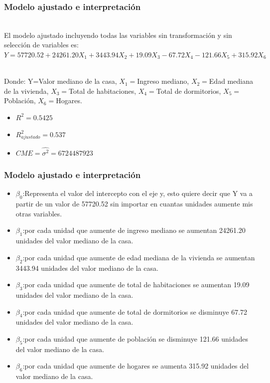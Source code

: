 \documentclass[12pt]{beamer}
\begin{document}
\begin{frame}
\frametitle{Modelo ajustado e interpretación}
~\\ El modelo ajustado incluyendo todas las variables sin transformación y sin selección de variables es:
~\\ $Y=57720.52+24261.20X_{1}+3443.94X_{2}+19.09X_{3}-67.72X_{4}-121.66X_{5}+315.92X_{6}$

~\\ Donde: Y=Valor mediano de la casa, $X_{1}=$Ingreso mediano, $X_{2}=$Edad mediana de la vivienda, $X_{3}=$Total de habitaciones, $X_{4}=$Total de dormitorios, $X_{5}=$Población, $X_{6}=$Hogares.
\begin{itemize}
\item $R^2=0.5425$
\item $R^2_{ajustado}=0.537$
\item $CME=\hat{\sigma^2}=6724487923$
\end{itemize}
\end{frame}


\begin{frame}
\frametitle{Modelo ajustado e interpretación}
\begin{itemize}
\item $\beta_{0}$:Representa el valor del intercepto con el eje y, esto quiere decir que Y va a partir de un valor de 57720.52 sin importar en cuantas unidades aumente mis otras variables.  
\item $\beta_{1}$:por cada unidad que aumente de ingreso mediano se aumentan 24261.20 unidades del valor mediano de la casa.
\item $\beta_{2}$:por cada unidad que aumente de edad mediana de la vivienda se aumentan 3443.94 unidades del valor mediano de la casa.
\item $\beta_{3}$:por cada unidad que aumente de total de habitaciones se aumentan 19.09 unidades del valor mediano de la casa.
\item $\beta_{4}$:por cada unidad que aumente de total de dormitorios se disminuye 67.72 unidades del valor mediano de la casa.
\end{itemize}
\end{frame}
\begin{frame}
\begin{itemize}
\item $\beta_{5}$:por cada unidad que aumente de población se disminuye 121.66 unidades del valor mediano de la casa.
\item $\beta_{6}$:por cada unidad que aumente de hogares se aumenta 315.92 unidades del valor mediano de la casa.
\end{itemize}
\end{frame}
\end{document}

